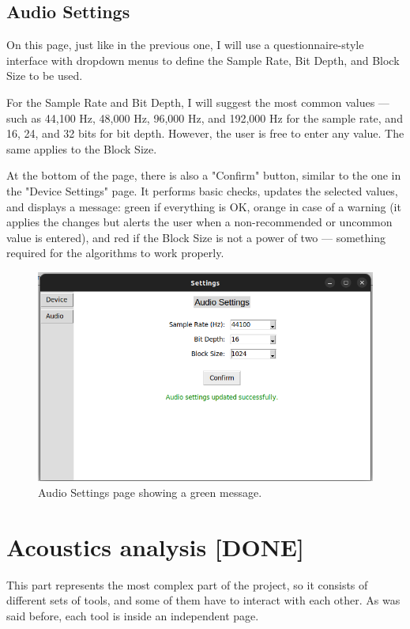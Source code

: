 \subsection{Audio Settings}

On this page, just like in the previous one, I will use a questionnaire-style interface with dropdown menus to define the Sample Rate, Bit Depth, and Block Size to be used.

For the Sample Rate and Bit Depth, I will suggest the most common values — such as 44,100 Hz, 48,000 Hz, 96,000 Hz, and 192,000 Hz for the sample rate, and 16, 24, and 32 bits for bit depth. However, the user is free to enter any value. The same applies to the Block Size.

At the bottom of the page, there is also a "Confirm" button, similar to the one in the "Device Settings" page. It performs basic checks, updates the selected values, and displays a message: green if everything is OK, orange in case of a warning (it applies the changes but alerts the user when a non-recommended or uncommon value is entered), and red if the Block Size is not a power of two — something required for the algorithms to work properly.

\begin{figure}[H]
	\centering
	\includegraphics[width=0.8
	\linewidth]{Figures/AudSet.png}
	\caption{Audio Settings page showing a green message.}
	\label{fig:Audio Settings}
\end{figure}



\section{Acoustics analysis [DONE]}

This part represents the most complex part of the project, so it consists of different sets of tools, and some of them have to interact with each other. As was said before, each tool is inside an independent page.

